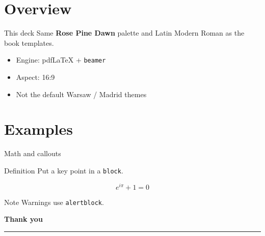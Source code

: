 \section{Overview}

\begin{frame}{This deck}
  Same \textbf{Rose Pine Dawn} palette and Latin Modern Roman as the book templates.
  \begin{itemize}
    \item Engine: pdfLaTeX + \texttt{beamer}
    \item Aspect: 16:9
    \item Not the default Warsaw / Madrid themes
  \end{itemize}
\end{frame}

\section{Examples}

\begin{frame}{Math and callouts}
  \begin{block}{Definition}
    Put a key point in a \texttt{block}.
  \end{block}
  \begin{equation*}
    e^{i\pi} + 1 = 0
  \end{equation*}
  \begin{alertblock}{Note}
    Warnings use \texttt{alertblock}.
  \end{alertblock}
\end{frame}

\begin{frame}[plain]
  \vfill
  \centering
  {\Large\bfseries\color{chaptercolor} Thank you\par}
  \vspace{0.6em}
  {\color{coveraccent}\rule{0.22\textwidth}{1.2pt}}
  \vfill
\end{frame}
